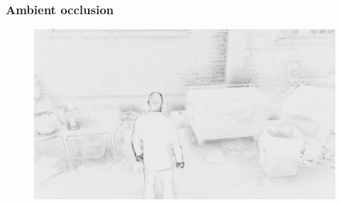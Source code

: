 \begin{frame}\frametitle{Ambient occlusion}
  \begin{figure}[h]
    \includegraphics[width=11.5cm,keepaspectratio]{pics/shadows/ambientOcclusion/hitmanDifference}
  \end{figure}
\end{frame}
